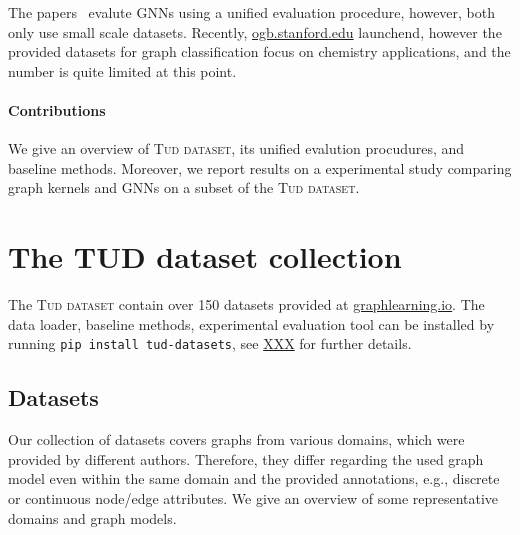 \documentclass{article}
\theoremstyle{definition}
\begin{document}
The papers~\cite{Fey+2019,Err+2019,Dwi+2020} evalute GNNs using a unified evaluation procedure, however, both only use small scale datasets. Recently, \url{ogb.stanford.edu} launchend, however the provided datasets for graph classification focus on chemistry applications, and the number is quite limited at this point.



\paragraph{Contributions} We give an overview of \textsc{Tud dataset}, its unified evalution procudures, and baseline methods. Moreover, we report results on a experimental study comparing graph kernels and GNNs on a subset of the \textsc{Tud dataset}.

\section{The TUD dataset collection}

The \textsc{Tud dataset} contain over 150 datasets provided at \url{graphlearning.io}. The data loader, baseline methods, experimental evaluation tool can be installed by running \texttt{pip install tud-datasets}, see \url{XXX} for further details.

\subsection{Datasets}

Our collection of datasets covers graphs from various domains, which were provided by different authors. Therefore, they differ regarding the used graph model even within the same domain and the provided annotations, e.g., discrete or continuous node/edge attributes. We give an overview of some representative domains and graph models.
\end{document}
